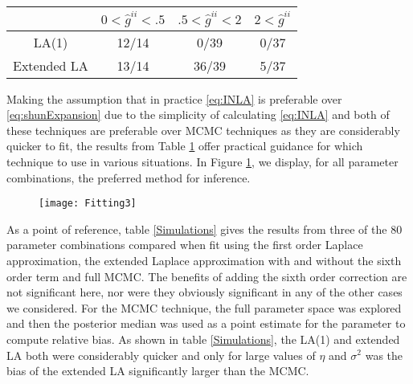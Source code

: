 \documentclass[11pt]{isuthesis}
\begin{document}
		
		\begin{table}[h]
			\begin{center}
				\begin{tabular}{ |c|c|c|c| } 
					\hline
					&$0<\hat{g}^{ii}<.5$&$ .5<\hat{g}^{ii}<2$ & $2<\hat{g}^{ii}$\\
					\hline
					LA(1)& 12/14 & 0/39 & 0/37\\
					Extended LA & 13/14 & 36/39 & 5/37\\
					\hline
				\end{tabular}
			\end{center}
			\label{Simulations2}
		\end{table}
	Making the assumption that in practice \eqref{eq:INLA} is preferable over \eqref{eq:shunExpansion} due to the simplicity of calculating \eqref{eq:INLA} and both of these techniques are preferable over MCMC techniques as they are considerably quicker to fit, the results from Table \ref{Simulations2} offer practical guidance for which technique to use in various situations.  In Figure \ref{fig:Fitting}, we display, for all parameter combinations, the preferred method for inference.
	
	
	\begin{figure}[!htp]
		\centering
		\texttt{[image: Fitting3]}
		\label{fig:Fitting}
	\end{figure}
	
	 As a point of reference, table \ref{Simulations} gives the results from three of the 80 parameter combinations compared when fit using the first order Laplace approximation, the extended Laplace approximation with and without the sixth order term and full MCMC. The benefits of adding the sixth order correction are not significant here, nor were they obviously significant in any of the other cases we considered.   For the MCMC technique, the full parameter space was explored and then the posterior median was used as a point estimate for the parameter to compute relative bias.  As shown in table \ref{Simulations}, the LA(1) and extended LA both were considerably quicker and only for large values of $\eta$ and $\sigma^2$ was the bias of the extended LA significantly larger than the MCMC.
	 
\end{document}
